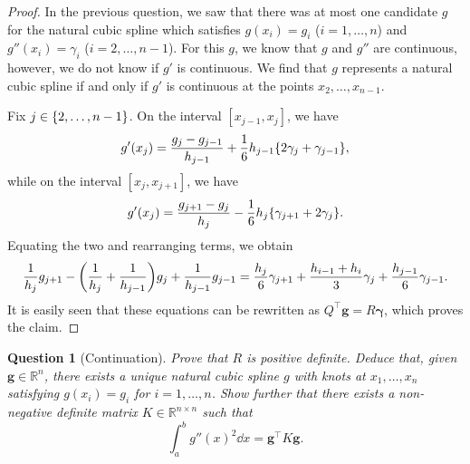 \documentclass{article}
\theoremstyle{plain}
\newtheorem{question}{Question}
\theoremstyle{remark}
\renewcommand{\vec}{\boldsymbol}
\newcommand{\Bb}{\mathbb}
\newcommand{\RR}{\Bb R}
\newcommand{\T}{^\top} %
\begin{document}
\begin{proof}
	In the previous question, we saw that there was at most one candidate $g$ for the natural cubic spline which satisfies $g(x_i) = g_i$ ($i =1, \dotsc, n$) and $g''(x_i) = \gamma_i$ ($i = 2, \dotsc, n-1$). For this $g$, we know that $g$ and $g''$ are continuous, however, we do not know if $g'$ is continuous. We find that $g$ represents a natural cubic spline if and only if $g'$ is continuous at the points $x_2, \dotsc, x_{n-1}$. 

	Fix $j \in \qty{2, \dotsc, n-1}$.  On the interval $[x_{j-1}, x_j]$, we have 
	\[
	g'(x_j) = \frac{g_j - g_{j-1}}{h_{j-1}} + \frac16 h_{j-1}  \qty{2 \gamma_j + \gamma_{j-1}},
	\]
	while on the interval $[x_j, x_{j+1}]$, we have
	\[
	g'(x_j) = \frac{g_{j+1} - g_j}{h_j} - \frac16 h_j \qty{\gamma_{j+1} + 2 \gamma_j}. 
	\]
	Equating the two and rearranging terms, we obtain
	\[
	\frac{1}{h_j} g_{j+1} - \qty(\frac{1}{h_j} + \frac1{h_{j-1}}) g_j + \frac1{h_{j-1}} g_{j-1} = \frac{h_j}{6} \gamma_{j+1} + \frac{h_{i-1} + h_i}{3} \gamma_j + \frac{h_{j-1}}{6} \gamma_{j-1}.
	\]
	It is easily seen that these equations can be rewritten as $Q\T \vec g = R\vec \gamma$, which proves the claim. 
\end{proof}

\begin{question}[Continuation]
	Prove that $R$ is positive definite. Deduce that, given $\vec g \in \RR^n$, there exists a unique natural cubic spline $g$ with knots at $x_1, \dotsc, x_n$ satisfying $g(x_i) = g_i$ for $i = 1, \dotsc, n$. Show further that there exists a non-negative definite matrix $K \in \RR^{n \times n}$ such that 
	\[
	\int_a^b g''(x)^2 \dd{x} = \vec g\T K\vec g. 
	\]
\end{question}
\end{document}
